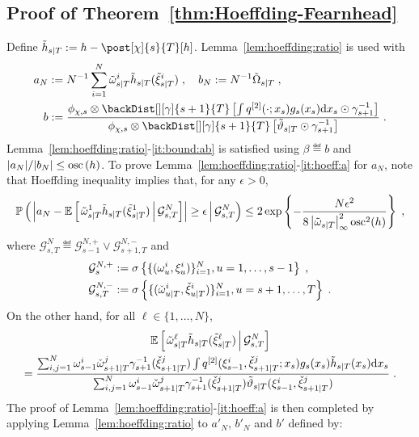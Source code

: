 \subsection{Proof of Theorem~\ref{thm:Hoeffding-Fearnhead}}
\label{proof:thm:Hoeffding-Fearnhead}
Define $\tilde{h}_{s|T} \eqdef h - \post[\chi]{s}{T} [h]$. Lemma~\ref{lem:hoeffding:ratio} is used with
\begin{align*}
a_N &\eqdef N^{-1} \sum_{i=1}^N \smwght{s}{T}{i} \tilde{h}_{s|T}(\smpart{s}{T}{i})\eqsp, \quad b_N \eqdef N^{-1} \tilde{\Omega}_{s|T}\eqsp,\\
b& \eqdef \frac{\filt{\Xinit,s}\otimes \backDist[][\gamma]{s+1}{T}\left[\int q^{[2]}(\cdot;x_s) g_s(x_s) \rmd x_s\odot \gamma_{s+1}^{-1}\right]}{\filt{\Xinit,s}\otimes \backDist[][\gamma]{s+1}{T}\left[\adjfunc[smooth]{s}{T}{} \odot \gamma_{s+1}^{-1}\right]}\eqsp.
\end{align*}
Lemma~\ref{lem:hoeffding:ratio}-\eqref{it:bound:ab} is satisfied using $\beta \eqdef b$ and  $|a_N|/|b_N| \le \oscnorm{h}$. To prove Lemma~\ref{lem:hoeffding:ratio}-\eqref{it:hoeff:a} for $a_N$, note that Hoeffding inequality implies that, for any $\epsilon > 0$,
\[
\CPP{\left| a_N - \CPE{\smwght{s}{T}{1} \tilde{h}_{s|T}(\smpart{s}{T}{1})}{\mathcal{G}^N_{s,T}} \right| \geq \epsilon}{\mathcal{G}^N_{s,T}} \leq 2\, \mathrm{exp}\left\{-\frac{N\epsilon^2}{8\esssup{\smwghtfunc{s}{T}}^2\oscnorm[2]{h}}\right\} \eqsp,
\]
where $\mathcal{G}^N_{s,T} \eqdef \mathcal{G}^{N,+}_{s-1} \vee \mathcal{G}^{N,-}_{s+1,T}$ and
\begin{align*}
\mathcal{G}^{N,+}_{s}&:= \sigma\left\{ \{ (\omega_{u}^{i}, \xi_{u}^{i}) \}_{i=1}^N, u =1, \dots, s-1\right\}\;,\\
\mathcal{G}^{N,-}_{s,T} &:= \sigma \left\{ \{ ({\check{\omega}}_{u|T}^{i},{\check{\xi}}_{u|T}^{i}) \}_{i=1}^N, u=s+1,\dots, T \right\}\;.
\end{align*}
On the other hand, for all $\ell \in\{1,\ldots,N\}$,
\begin{multline*}
\CPE{\smwght{s}{T}{\ell} \tilde{h}_{s|T}(\smpart{s}{T}{\ell})}{\mathcal{G}^N_{s,T}} \\
= \frac{\sum_{i,j=1}^N \ewght{s-1}{i} \ebackwght{s+1}{T}{j}\gamma_{s+1}^{-1}(\ebackpart{s+1}{T}{j}) \int q^{[2]}(\epart{s-1}{i},\ebackpart{s+1}{T}{j};x_s) g_s(x_s) \tilde{h}_{s|T}(x_s) \rmd x_s}{\sum_{i,j=1}^N \ewght{s-1}{i} \ebackwght{s+1}{T}{j}\gamma_{s+1}^{-1}(\ebackpart{s+1}{T}{j})\adjfunc[smooth]{s}{T}{\epart{s-1}{i},\ebackpart{s+1}{T}{j}}} \eqsp.
\end{multline*}
The proof of Lemma~\ref{lem:hoeffding:ratio}-\eqref{it:hoeff:a} is then completed by applying Lemma~\ref{lem:hoeffding:ratio} to $a'_N$, $b'_N$ and $b'$ defined by:
